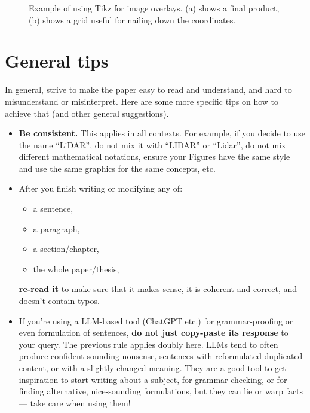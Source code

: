 \begin{figure}[!t]

  \centering

  

  \caption{Example of using Tikz for image overlays. (a) shows a final product, (b) shows a grid useful for nailing down the coordinates.}
  \label{fig:tikz_overlay}

\end{figure}

\section{General tips}

In general, strive to make the paper easy to read and understand, and hard to misunderstand or misinterpret.
Here are some more specific tips on how to achieve that (and other general suggestions).

\begin{itemize}
  \item
    \textbf{Be consistent.}
    This applies in all contexts.
    For example, if you decide to use the name \enquote{LiDAR}, do not mix it with \enquote{LIDAR} or \enquote{Lidar},
    do not mix different mathematical notations,
    ensure your Figures have the same style and use the same graphics for the same concepts,
    etc.
  \item 
    After you finish writing or modifying any of:
    \begin{itemize}
      \item a sentence,
      \item a paragraph,
      \item a section/chapter,
      \item the whole paper/thesis,
    \end{itemize}
    \textbf{re-read it} to make sure that it makes sense, it is coherent and correct, and doesn't contain typos.
  \item
    If you're using a LLM-based tool (ChatGPT etc.) for grammar-proofing or even formulation of sentences, \textbf{do not just copy-paste its response} to your query.
    The previous rule applies doubly here.
    LLMs tend to often produce confident-sounding nonsense, sentences with reformulated duplicated content, or with a slightly changed meaning.
    They are a good tool to get inspiration to start writing about a subject, for grammar-checking, or for finding alternative, nice-sounding formulations, but they can lie or warp facts --- take care when using them!

\end{itemize}